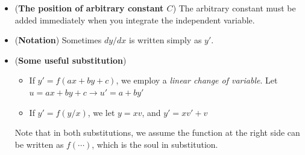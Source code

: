 \documentclass[10pt, landscape]{article}
\begin{document}
\begin{multicols}{4}
\begin{enumerate}
    \begin{itemize}
        \item (\textbf{The position of arbitrary constant $C$}) The arbitrary constant must be added immediately when you integrate the independent variable.
        \item (\textbf{Notation}) Sometimes $dy/dx$ is written simply as $y'$.
        \item (\textbf{Some useful substitution})
        \begin{itemize}
            \item If $y'=f(ax+by+c)$, we employ a \textit{linear change of variable}. Let $u=ax+by+c\rightarrow u'=a+by'$
            \item If $y'=f(y/x)$, we let $y=xv$, and $y'=xv'+v$
        \end{itemize}
        Note that in both substitutions, we assume the function at the right side can be written as $f(\cdots)$, which is the soul in substitution.
    \end{itemize}
\end{enumerate}

\end{multicols}
\end{document}
